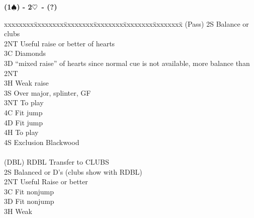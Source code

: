 \documentclass[10pt]{article}
\newcommand{\h}{$\heartsuit$}
\newcommand{\s}{$\spadesuit$}
\newcommand{\x}{DBL}
\newenvironment{bidtable}[1][]
{\textbf{#1}
  \begin{adjustwidth}{1em}{}
    \addvspace{2pt}
    \begin{tabbing}
      xxxxxxxx\=xxxxxxxx\=xxxxxxxx\=xxxxxxxx\=xxxxxxxx\=xxxxxxxx\=\kill}
{\end{tabbing}\end{adjustwidth}\bigskip}%
\begin{document}
\begin{multicols*}{2}
\begin{bidtable}[(1\s) - 2\h\ - (?)]
(Pass) \> 2S   \> Balance or clubs                                                                 \\
       \> 2NT  \> Useful raise or better of hearts                                                 \\
       \> 3C   \> Diamonds                                                                         \\
       \> 3D   \> “mixed raise” of hearts since normal cue is not available, more balance than 2NT \\
       \> 3H   \> Weak raise                                                                       \\
       \> 3S   \> Over major, splinter, GF                                                         \\
       \> 3NT  \> To play                                                                          \\
       \> 4C   \> Fit jump                                                                         \\
       \> 4D   \> Fit jump                                                                         \\
       \> 4H   \> To play                                                                          \\
       \> 4S   \> Exclusion Blackwood                                                              \\
                                                                                                   \\
(\x)   \> RDBL \> Transfer to CLUBS                                                                \\
       \> 2S   \> Balanced or D’s  (clubs show with RDBL)                                          \\
       \> 2NT  \> Useful Raise or better                                                           \\
       \> 3C   \> Fit nonjump                                                                      \\
       \> 3D   \> Fit nonjump                                                                      \\
       \> 3H   \> Weak                                                                             \\

\end{bidtable}
\end{multicols*}
\end{document}
